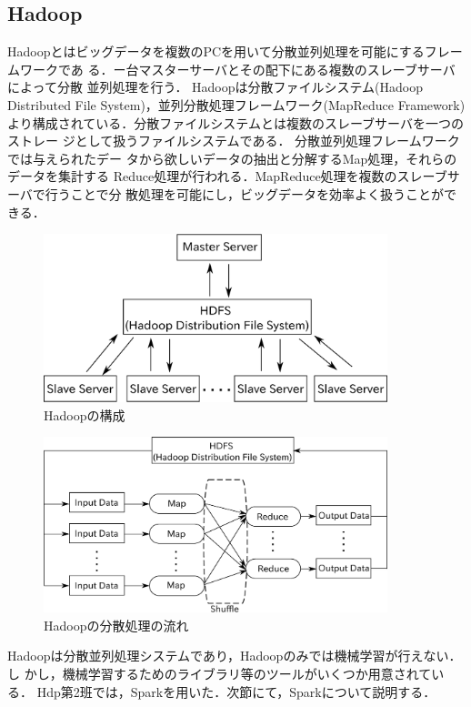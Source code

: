 \documentclass[a4paper,12pt]{jarticle}
\begin{document}
\subsection{Hadoop}
Hadoopとはビッグデータを複数のPCを用いて分散並列処理を可能にするフレームワークであ
る．ー台マスターサーバとその配下にある複数のスレーブサーバによって分散
並列処理を行う．
Hadoopは分散ファイルシステム(Hadoop Distributed File
System)，並列分散処理フレームワーク(MapReduce
Framework)より構成されている．分散ファイルシステムとは複数のスレーブサーバを一つのストレー
ジとして扱うファイルシステムである．
分散並列処理フレームワークでは与えられたデー
タから欲しいデータの抽出と分解するMap処理，それらのデータを集計する
Reduce処理が行われる．MapReduce処理を複数のスレーブサーバで行うことで分
散処理を可能にし，ビッグデータを効率よく扱うことができる．
%
\begin{figure}[htbp]
 \begin{center}
  \includegraphics[width=100mm]{fig/Hadoop.eps}
  \caption{Hadoopの構成}
  \label{fig:hadoop}
 \end{center}
\end{figure}
%
%
\begin{figure}[htbp]
 \begin{center}
  \includegraphics[width=100mm]{fig/MapReduce.eps}
  \caption{Hadoopの分散処理の流れ}
  \label{fig:MapReduce}
 \end{center}
\end{figure}
%
Hadoopは分散並列処理システムであり，Hadoopのみでは機械学習が行えない．し
かし，機械学習するためのライブラリ等のツールがいくつか用意されている．
Hdp第2班では，Sparkを用いた．次節にて，Sparkについて説明する．
\end{document}
